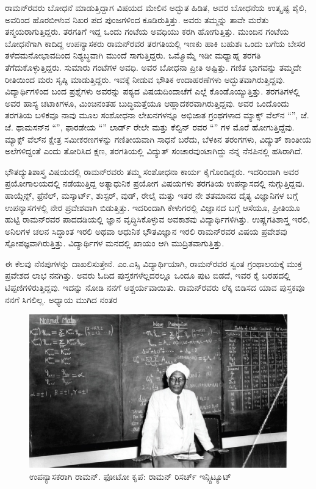 ರಾಮನ್‍ರವರು ಬೋಧನೆ ಮಾಡುತ್ತಿದ್ದಾಗ ವಿಷಯದ ಮೇಲಿನ ಅದ್ಭುತ ಹಿಡಿತ, ಅವರ ಬೋಧನೆಯ ಉತ್ಕೃಷ್ಟ ಶೈಲಿ, ಅವರಿಂದ ಹೊರಬೀಳುವ ನಿಖರ ಪದ ಪುಂಜಗಳಿಂದ ಕೂಡಿರುತ್ತಿತ್ತು. ಅವರು ತಮ್ಮನ್ನು ತಾವೇ ಮರೆತು ತನ್ಮಯರಾಗುತ್ತಿದ್ದರು. ತರಗತಿಗೆ ಇದ್ದ ಒಂದು ಗಂಟೆಯ ಅವಧಿಯು ಕರಗಿ ಹೋಗುತ್ತಿತ್ತು. ಮುಂದಿನ ಗಂಟೆಯ ಬೋಧನೆಗಾಗಿ ಕಾದಿದ್ದ ಉಪನ್ಯಾಸಕರು ರಾಮನ್‍ರವರ ತರಗತಿಯಲ್ಲಿ ಇಣಕು ಹಾಕಿ ಬಹುಶಃ ಒಂದು ಬಗೆಯ ಬೇಸರ ತಳೆದ\break ಮನೋಭಾವದಿಂದ ನಿಶ್ಯಬ್ಧವಾಗಿ ಮುಂದೆ ಸಾಗುತ್ತಿದ್ದರು. ಒಮ್ಮೊಮ್ಮೆ ಇಡೀ ಮಧ್ಯಾಹ್ನ ತರಗತಿ ತೆಗೆದುಕೊಳ್ಳುತ್ತಿದ್ದರು. ಸುಮಾರು  ಗಂಟೆಗಳ ಅವಧಿ. ಅವರ ಬೋಧನಾ ಪ್ರೀತಿ ಅಷ್ಟಿತ್ತು. ಗಣಿತ ಭಾಗವನ್ನು ತಮ್ಮದೇ ರೀತಿಯಿಂದ ಮರು ಸೃಷ್ಠಿ ಮಾಡುತ್ತಿದ್ದರು. ಇವಕ್ಕೆ ನೀಡುವ ಭೌತಿಕ ಉದಾಹರಣೆಗಳು ಅದ್ಭುತವಾಗಿರುತ್ತಿದ್ದವು. ವಿದ್ಯಾರ್ಥಿಗಳಿಂದ ಬಂದ ಪ್ರಶ್ನೆಗಳು ಅವರನ್ನು ಪಠ್ಯದ ವಿಷಯದಿಂದಾಚೆಗೆ ಎಲ್ಲೆ ಕೊಂಡೊಯ್ಯುತ್ತಿತ್ತು. ತರಗತಿಗಳಲ್ಲಿ ಅವರ ಹಾಸ್ಯ ಚಟಾಕಿಗಳೂ, ಮಿಂಚಿನಂತಹ ಬುದ್ಧಿಮತ್ತೆಯೂ ಆಹ್ಲಾದಕರವಾಗಿರುತ್ತಿದ್ದವು. ಅವರ ಒಂದೊಂದು ತರಗತಿಯ ಬಳಿಕವೂ ನಾವು ಮೂಲ ಸಂಶೋಧನಾ ಲೇಖನಗಳನ್ನೂ ಅಭಿಜಾತ ಗ್ರಂಥಗಳಾದ ಮ್ಯಾಕ್ಸ್ ವೆಲ್‍ನ “”, ಜೆ. ಜೆ. ಥಾಮಸನ್‍ನ “”, ಫಾರಡೇಯ “” ಲಾರ್ಡ್ ರೇಲೇ ಮತ್ತು ಕೆಲ್ವಿನ್ ರವರ “” ಗಳ ಮೊರೆ ಹೋಗುತ್ತಿದ್ದೆವು. ಮ್ಯಾಕ್ಸ್ ವೆಲ್‍ನ ಕ್ಷೇತ್ರ ಸಮೀಕರಣಗಳನ್ನು ಗಣಿತೀಯವಾಗಿ ಸಾಧನೆ ಬರೆದು, ಬೆಳಕಿನ ತರಂಗಗಳು, ವಿದ್ಯುತ್ ಕಾಂತೀಯ ಅಲೆಗಳಿದ್ದಂತೆ ಎಂದು ತೋರಿಸಿದ ಕ್ಷಣ, ತರಗತಿಯಲ್ಲಿ ವಿದ್ಯುತ್ ಸಂಚಾರವುಂಟಾಗಿದ್ದು ನನ್ನ ನೆನಪಿನಲ್ಲಿ ಹಸಿರಾಗಿದೆ.

ಭೌತದ್ಯುತಿಶಾಸ್ತ್ರ ವಿಷಯದಲ್ಲಿ ರಾಮನ್‍ರವರು ತಮ್ಮ ಸಂಶೋಧನಾ ಕಾರ್ಯ ಕೈಗೊಂಡಿದ್ದರು. ಇದರಿಂದಾಗಿ ಅವರ ಪ್ರಯೋಗಾಲಯದಲ್ಲಿ ನಡೆಯುತ್ತಿದ್ದ ಅತ್ಯಾಧುನಿಕ ಪ್ರಯೋಗ ವಿಷಯಗಳು ತರಗತಿಯ ಉಪನ್ಯಾಸದಲ್ಲಿ ನುಗ್ಗುತ್ತಿದ್ದವು. ಹಾಯ್ಗೆನ್ಸ್, ಫ್ರೆನೆಲ್, ಮಸ್ಕಾರ್ಟ್, ಶುಸ್ಟರ್, ವುಡ್, ರೇಲೈ ಮತ್ತು ಇತರ ನೇ ಶತಮಾನದ ದೈತ್ಯ ವಿಜ್ಞಾನಿಗಳ ಬಗ್ಗೆ ಉಪನ್ಯಾಸಗಳಲ್ಲಿ ನೇರ ಪ್ರವೇಶವಾಗಿ ಬಿಡುತ್ತಿತ್ತು. ಇದರಿಂದಾಗಿ ಕೇಳುಗರಲ್ಲಿ ವಿಜ್ಞಾನದ ಬಗ್ಗೆ ಆಸೆಯೂ, ಪ್ರೀತಿಯೂ ಹುಟ್ಟಿ ರಾಮನ್‍ರವರ ಪಾದದಡಿಯಲ್ಲಿ ಜ್ಞಾನ ವೃದ್ಧಿಸಿಕೊಳ್ಳುವ ಅವಕಾಶವು ವಿದ್ಯಾರ್ಥಿಗಳಿಗಿತ್ತು. ಉಷ್ಣಗತಿಶಾಸ್ತ್ರ ಇರಲಿ, ಅನಿಲಗಳ ಚಲನ ಸಿದ್ಧಾಂತ ಇರಲಿ ಅಥವಾ ಆಧುನಿಕ ಭೌತವಿಜ್ಞಾನ ಇರಲಿ ರಾಮನ್‍ರವರ ವಿಷಯ ಪ್ರವೇಶವು ಸ್ಪೋಪಜ್ಞವಾಗಿರುತ್ತಿತ್ತು. ವಿದ್ಯಾರ್ಥಿಗಳ ಮನದಲ್ಲಿ ಖಾಯಂ ಆಗಿ ಮುದ್ರಿತವಾಗುತ್ತಿತ್ತು.

ಈ ಕೆಲವು ನೆನಪುಗಳನ್ನು ದಾಖಲಿಸುತ್ತೇನೆ. ಎಂ.ಎಸ್ಸಿ ವಿದ್ಯಾರ್ಥಿಯಾಗಿ, ರಾಮನ್‍ರವರ ಸ್ವಂತ ಗ್ರಂಥಾಲಯಕ್ಕೆ ಮುಕ್ತ ಪ್ರವೇಶದ ಲಾಭ ನನಗಿತ್ತು. ಅವರು ಓದಿದ ಪುಸ್ತಕಗಳೆಲ್ಲದರಲ್ಲೂ ಒಂದೂ ಪುಟ ಬಿಡದೆ, ಇವರ ಕೈ ಬರಹದಲ್ಲಿ ಟಿಪ್ಪಣಿಗಳಿರುತ್ತಿದ್ದವು. ಇದನ್ನು ನೋಡಿ ನನಗೆ ಆಶ್ಚರ್ಯವಾಯಿತು. ರಾಮನ್‍ರವರು ಲೆಕ್ಕ ಬಿಡಿಸದ ಯಾವ ಪುಸ್ತಕವೂ ನನಗೆ ಸಿಗಲಿಲ್ಲ. ಅಧ್ಯಾಯ ಮುಗಿದ ನಂತರ\break
\begin{figure}[!htbp]
\centering
\includegraphics[scale=0.24]{"images/14.jpg"}
\caption{ಉಪನ್ಯಾಸಕರಾಗಿ ರಾಮನ್. ಫೋಟೋ ಕೃಪೆ: ರಾಮನ್‌ ರಿಸರ್ಚ್ ಇನ್ಸ್ಟಿಟ್ಯೂಟ್}\label{chap4-fig01}
\end{figure}

